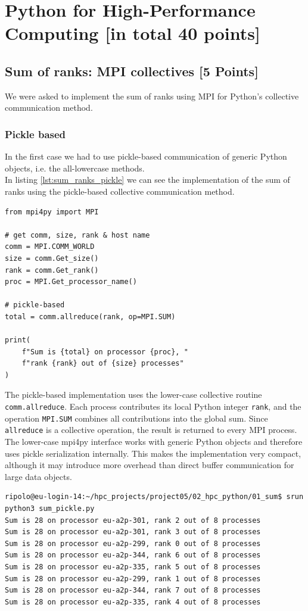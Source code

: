 \documentclass[unicode,10pt,a4paper,oneside,numbers=endperiod,openany]{scrartcl}
\begin{document}
\newpage

\section{Python for High-Performance Computing [in total 40 points]}

\subsection{Sum of ranks: MPI collectives [5 Points]}
We were asked to implement the sum of ranks using MPI for Python’s collective communication method.
\subsubsection{Pickle based}
In the first case we had to use pickle-based communication of generic Python objects, i.e. the all-lowercase methods.\\
In listing \ref{lst:sum_ranks_pickle} we can see the implementation of the sum of ranks using the pickle-based collective communication method.
\begin{lstlisting}[style=grayverbatim,label={lst:sum_ranks_pickle},caption={Sum of ranks using pickle-based collective communication}]
from mpi4py import MPI

# get comm, size, rank & host name
comm = MPI.COMM_WORLD
size = comm.Get_size()
rank = comm.Get_rank()
proc = MPI.Get_processor_name()

# pickle-based 
total = comm.allreduce(rank, op=MPI.SUM)

print(
    f"Sum is {total} on processor {proc}, "
    f"rank {rank} out of {size} processes"
)
\end{lstlisting}
The pickle-based implementation uses the lower-case collective routine
\texttt{comm.allreduce}. Each process contributes its local Python integer
\texttt{rank}, and the operation \texttt{MPI.SUM} combines all contributions
into the global sum. Since \texttt{allreduce} is a collective operation, the
result is returned to every MPI process. The lower-case mpi4py interface works
with generic Python objects and therefore uses pickle serialization internally.
This makes the implementation very compact, although it may introduce more
overhead than direct buffer communication for large data objects.
\begin{lstlisting}[style=grayverbatim,label={lst:sum_ranks_output},caption={Output of the sum of ranks using pickle-based collective communication}]
ripolo@eu-login-14:~/hpc_projects/project05/02_hpc_python/01_sum$ srun python3 sum_pickle.py
Sum is 28 on processor eu-a2p-301, rank 2 out of 8 processes
Sum is 28 on processor eu-a2p-301, rank 3 out of 8 processes
Sum is 28 on processor eu-a2p-299, rank 0 out of 8 processes
Sum is 28 on processor eu-a2p-344, rank 6 out of 8 processes
Sum is 28 on processor eu-a2p-335, rank 5 out of 8 processes
Sum is 28 on processor eu-a2p-299, rank 1 out of 8 processes
Sum is 28 on processor eu-a2p-344, rank 7 out of 8 processes
Sum is 28 on processor eu-a2p-335, rank 4 out of 8 processes
\end{lstlisting}
\end{document}
